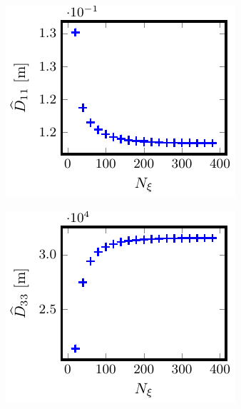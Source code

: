 \documentclass[10pt]{iopart}
\begin{document}
\begin{figure}[t]
	\centering
	\begin{subfigure}[t]{0.32\textwidth}
		\includegraphics{Convergence-Legendre-W7X-KJM-s0204-Er-0-D11}
		\caption{}
		\label{subfig:D11_convergence_Legendre_W7X_KJM_0204_Erho_0}
	\end{subfigure}
	\begin{subfigure}[t]{0.32\textwidth}
		\includegraphics{Convergence-Legendre-W7X-KJM-s0204-Er-0-D33}
		\caption{}
		\label{subfig:D33_convergence_Legendre_W7X_KJM_0204_Erho_0}
	\end{subfigure}
	

\end{figure}
\end{document}
